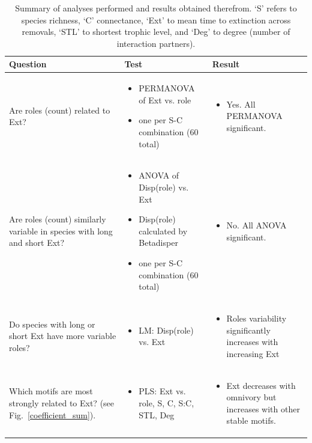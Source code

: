 \documentclass[12pt]{article}
\begin{document}
\begin{landscape}
    \begin{table}[h!]
        \centering
        \caption{Summary of analyses performed and results obtained therefrom. `S' refers to species richness, `C' connectance, `Ext' to mean time to extinction across removals, `STL' to shortest trophic level, and `Deg' to degree (number of interaction partners).}
        \label{overview_table}
        \footnotesize
        \begin{tabular}{m{6.5cm}|m{7cm}|m{8cm}}
        Question & Test & Result \\
        \hline
        Are roles (count) related to Ext? & 
        \begin{itemize}
            \item PERMANOVA of Ext vs. role
            \item one per S-C combination (60 total)
        \end{itemize} 
        & \begin{itemize} \item Yes. All PERMANOVA significant. \end{itemize} \\
        Are roles (count) similarly variable in species with long and short Ext? & 
        \begin{itemize}
            \item ANOVA of Disp(role) vs. Ext
            \item Disp(role) calculated by Betadisper
            \item one per S-C combination (60 total)
        \end{itemize}
        & \begin{itemize} \item No. All ANOVA significant. \end{itemize} \\
        Do species with long or short Ext have more variable roles? & \begin{itemize}
            \item LM: Disp(role) vs. Ext
        \end{itemize} & \begin{itemize} \item Roles variability significantly increases with increasing Ext \end{itemize} \\
        \hline
        Which motifs are most strongly related to Ext? (see Fig.~\ref{coefficient_sum}). & \begin{itemize}
            \item PLS: Ext vs. role, S, C, S:C, STL, Deg \end{itemize} & \begin{itemize} \item Ext decreases with omnivory but increases with other stable motifs. \end{itemize} \\

\end{tabular}
\end{table}
\end{landscape}
\end{document}
